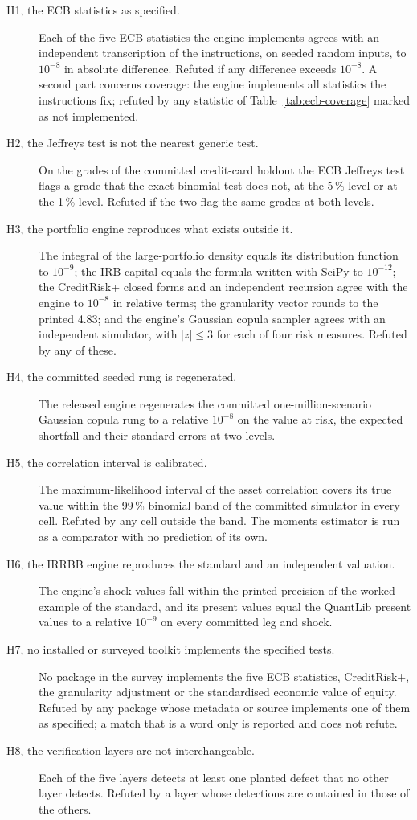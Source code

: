 \begin{description}
\item[H1, the ECB statistics as specified.] Each of the five ECB statistics the engine implements agrees with an independent transcription of the instructions, on seeded random inputs, to $10^{-8}$ in absolute difference. Refuted if any difference exceeds $10^{-8}$. A second part concerns coverage: the engine implements all \ecbSections{} statistics the instructions fix; refuted by any statistic of Table~\ref{tab:ecb-coverage} marked as not implemented.
\item[H2, the Jeffreys test is not the nearest generic test.] On the grades of the committed credit-card holdout the ECB Jeffreys test flags a grade that the exact binomial test does not, at the 5\,\% level or at the 1\,\% level. Refuted if the two flag the same grades at both levels.
\item[H3, the portfolio engine reproduces what exists outside it.] The integral of the large-portfolio density equals its distribution function to $10^{-9}$; the IRB capital equals the formula written with SciPy to $10^{-12}$; the CreditRisk+ closed forms and an independent recursion agree with the engine to $10^{-8}$ in relative terms; the granularity vector rounds to the printed 4.83; and the engine's Gaussian copula sampler agrees with an independent simulator, with $|z|\le3$ for each of four risk measures. Refuted by any of these.
\item[H4, the committed seeded rung is regenerated.] The released engine regenerates the committed one-million-scenario Gaussian copula rung to a relative $10^{-8}$ on the value at risk, the expected shortfall and their standard errors at two levels.
\item[H5, the correlation interval is calibrated.] The maximum-likelihood interval of the asset correlation covers its true value within the 99\,\% binomial band of the committed simulator in every cell. Refuted by any cell outside the band. The moments estimator is run as a comparator with no prediction of its own.
\item[H6, the IRRBB engine reproduces the standard and an independent valuation.] The engine's shock values fall within the printed precision of the worked example of the standard, and its present values equal the QuantLib present values to a relative $10^{-9}$ on every committed leg and shock.
\item[H7, no installed or surveyed toolkit implements the specified tests.] No package in the survey implements the five ECB statistics, CreditRisk+, the granularity adjustment or the standardised economic value of equity. Refuted by any package whose metadata or source implements one of them as specified; a match that is a word only is reported and does not refute.
\item[H8, the verification layers are not interchangeable.] Each of the five layers detects at least one planted defect that no other layer detects. Refuted by a layer whose detections are contained in those of the others.
\end{description}

